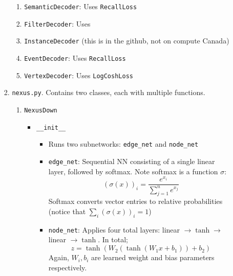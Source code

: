 \begin{itemize}
\begin{enumerate}
\begin{enumerate}
\begin{enumerate}
                            \item \texttt{SemanticDecoder}: Uses \texttt{RecallLoss}

                            \item \texttt{FilterDecoder}: Uses 

                            \item \texttt{InstanceDecoder} (this is in the github, not on compute Canada)

                            \item \texttt{EventDecoder}: Uses \texttt{RecallLoss}

                            \item \texttt{VertexDecoder}: Uses \texttt{LogCoshLoss}
                        \end{enumerate}
        

                    \item \texttt{nexus.py}. Contains two classes, each with multiple functions.
                        \begin{enumerate}
                            \item \texttt{NexusDown}
                                \begin{itemize} 
                                    \item \texttt{\_\_init\_\_}
                                        \begin{itemize}
                                            \item Runs two subnetworks: \texttt{edge\_net} and \texttt{node\_net}

                                            \item \texttt{edge\_net}: Sequential NN consisting of a single linear layer, followed by softmax. Note softmax is a function $\sigma$:
                                            \begin{equation}
                                                (\sigma(x))_i = \frac{e^{x_i}}{\sum_{j=1}^n e^{x_j}}
                                            \end{equation}
                                            Softmax converts vector entries to relative probabilities (notice that $\sum_i (\sigma(x))_i = 1$)

                                            \item \texttt{node\_net}: Applies four total layers: linear $\to \tanh \to$ linear $\to \tanh$. In total;
                                            \begin{equation}
                                                z = \tanh\left(W_2\left(\tanh\left(W_1x + b_1\right)\right) + b_2\right)
                                            \end{equation}
                                            Again, $W_i, b_i$ are learned weight and bias parameters respectively.
                                        \end{itemize}


\end{itemize}
\end{enumerate}
\end{enumerate}
\end{enumerate}
\end{itemize}
